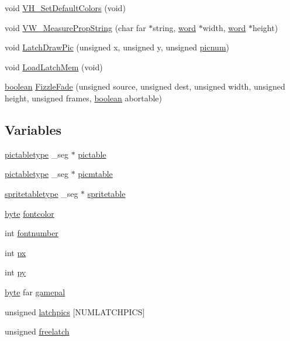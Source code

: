 \begin{DoxyCompactItemize}
\item 
void \hyperlink{ID__VH_8H_ae3b77f5480b8d0c1b9b64ee3a1341517}{VH\_\-SetDefaultColors} (void)
\item 
void \hyperlink{ID__VH_8H_a6f83e267adde8f5625ff9d63bde9d19f}{VW\_\-MeasurePropString} (char far $\ast$string, \hyperlink{ID__HEAD_8H_abad51e07ab6d26bec9f1f786c8d65bcd}{word} $\ast$width, \hyperlink{ID__HEAD_8H_abad51e07ab6d26bec9f1f786c8d65bcd}{word} $\ast$height)
\item 
void \hyperlink{ID__VH_8H_a0170b65c8e23e18b960bde1e8908887b}{LatchDrawPic} (unsigned x, unsigned y, unsigned \hyperlink{WL__TEXT_8C_a38ee8916c0c328929ad672895daca6d6}{picnum})
\item 
void \hyperlink{ID__VH_8H_a872a52095cf999d5cf5b93deac17193a}{LoadLatchMem} (void)
\item 
\hyperlink{ID__HEAD_8H_a7c6368b321bd9acd0149b030bb8275ed}{boolean} \hyperlink{ID__VH_8H_ae2893c63915f70a503b1a661d0416421}{FizzleFade} (unsigned source, unsigned dest, unsigned width, unsigned height, unsigned frames, \hyperlink{ID__HEAD_8H_a7c6368b321bd9acd0149b030bb8275ed}{boolean} abortable)
\end{DoxyCompactItemize}
\subsection*{Variables}
\begin{DoxyCompactItemize}
\item 
\hyperlink{structpictabletype}{pictabletype} \_\-seg $\ast$ \hyperlink{ID__VH_8H_a1ba97b4fa7a2259ee911a1154eda1dc9}{pictable}
\item 
\hyperlink{structpictabletype}{pictabletype} \_\-seg $\ast$ \hyperlink{ID__VH_8H_a5888fd9fd64478e98ddbe25d9114a3dd}{picmtable}
\item 
\hyperlink{structspritetabletype}{spritetabletype} \_\-seg $\ast$ \hyperlink{ID__VH_8H_ae25f2ed8cf7cf0b3fde08c2c5ef06380}{spritetable}
\item 
\hyperlink{ID__HEAD_8H_a0c8186d9b9b7880309c27230bbb5e69d}{byte} \hyperlink{ID__VH_8H_a37dfad01117cac8636922fd4d030131b}{fontcolor}
\item 
int \hyperlink{ID__VH_8H_a4837949d7c7b2ed1e3f5874b69986fd8}{fontnumber}
\item 
int \hyperlink{ID__VH_8H_a6bbc6b7e52b17450c52d8e748d6abae1}{px}
\item 
int \hyperlink{ID__VH_8H_aa9511a47fd6271333948489a220e3029}{py}
\item 
\hyperlink{ID__HEAD_8H_a0c8186d9b9b7880309c27230bbb5e69d}{byte} far \hyperlink{ID__VH_8H_a72ce00e98a92644d4cbf41fb10a2f7ad}{gamepal}
\item 
unsigned \hyperlink{ID__VH_8H_adbe64e9f4cdaee2e69ce2b915bd5c9ff}{latchpics} \mbox{[}NUMLATCHPICS\mbox{]}
\item 
unsigned \hyperlink{ID__VH_8H_a98fdbc277691b144bd2fcbceec9047f9}{freelatch}
\end{DoxyCompactItemize}


